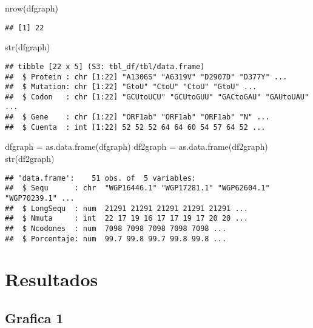 \documentclass[
]{article}
\newenvironment{Shaded}{\begin{snugshade}}{\end{snugshade}}
\newcommand{\FunctionTok}[1]{\textcolor[rgb]{0.00,0.00,0.00}{#1}}
\newcommand{\NormalTok}[1]{#1}
\newcommand{\OtherTok}[1]{\textcolor[rgb]{0.56,0.35,0.01}{#1}}
\begin{document}
\begin{Shaded}
\begin{Highlighting}[]
\FunctionTok{nrow}\NormalTok{(dfgraph)}
\end{Highlighting}
\end{Shaded}

\begin{verbatim}
## [1] 22
\end{verbatim}

\begin{Shaded}
\begin{Highlighting}[]
\FunctionTok{str}\NormalTok{(dfgraph)}
\end{Highlighting}
\end{Shaded}

\begin{verbatim}
## tibble [22 x 5] (S3: tbl_df/tbl/data.frame)
##  $ Protein : chr [1:22] "A1306S" "A6319V" "D2907D" "D377Y" ...
##  $ Mutation: chr [1:22] "GtoU" "CtoU" "CtoU" "GtoU" ...
##  $ Codon   : chr [1:22] "GCUtoUCU" "GCUtoGUU" "GACtoGAU" "GAUtoUAU" ...
##  $ Gene    : chr [1:22] "ORF1ab" "ORF1ab" "ORF1ab" "N" ...
##  $ Cuenta  : int [1:22] 52 52 52 64 64 60 54 57 64 52 ...
\end{verbatim}

\begin{Shaded}
\begin{Highlighting}[]
\NormalTok{dfgraph }\OtherTok{=} \FunctionTok{as.data.frame}\NormalTok{(dfgraph)}
\NormalTok{df2graph }\OtherTok{=} \FunctionTok{as.data.frame}\NormalTok{(df2graph)}
\FunctionTok{str}\NormalTok{(df2graph)}
\end{Highlighting}
\end{Shaded}

\begin{verbatim}
## 'data.frame':    51 obs. of  5 variables:
##  $ Sequ      : chr  "WGP16446.1" "WGP17281.1" "WGP62604.1" "WGP70239.1" ...
##  $ LongSequ  : num  21291 21291 21291 21291 21291 ...
##  $ Nmuta     : int  22 17 19 16 17 17 19 17 20 20 ...
##  $ Ncodones  : num  7098 7098 7098 7098 7098 ...
##  $ Porcentaje: num  99.7 99.8 99.7 99.8 99.8 ...
\end{verbatim}

\hypertarget{resultados}{%
\section{Resultados}\label{resultados}}

\hypertarget{grafica-1}{%
\subsection{Grafica 1}\label{grafica-1}}
\end{document}
